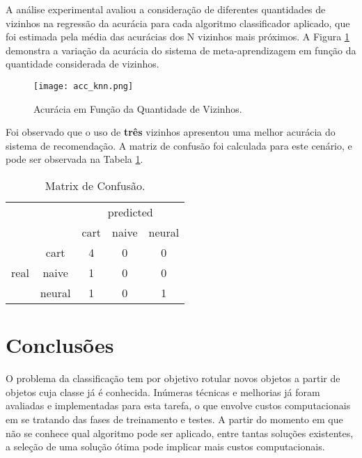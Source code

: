 \documentclass[runningheads]{llncs}
\begin{document}
A análise experimental avaliou a consideração de diferentes quantidades de vizinhos na regressão da acurácia para cada algoritmo classificador aplicado, que foi estimada pela média das acurácias dos N vizinhos mais próximos. A Figura \ref{acc} demonstra a variação da acurácia do sistema de meta-aprendizagem em função da quantidade considerada de vizinhos. 

\begin{figure}[ht]
\texttt{[image: acc\_knn.png]}
\caption{Acurácia em Função da Quantidade de Vizinhos.} \label{acc}
\end{figure}

Foi observado que o uso de \textbf{três} vizinhos apresentou uma melhor acurácia do sistema de recomendação. A matriz de confusão foi calculada para este cenário, e pode ser observada na Tabela \ref{confusion_matrix}.

\begin{table}[ht]
\centering
\caption{Matrix de Confusão.}\label{confusion_matrix}
\begin{tabular}{cc|c|c|c|}
\cline{3-5}
                                            &        & \multicolumn{3}{c|}{predicted} \\ \cline{3-5} 
                                            &        & cart    & naive    & neural    \\ \hline
\multicolumn{1}{|c|}{\multirow{3}{*}{real}} & cart   & 4       & 0        & 0         \\ \cline{2-5} 
\multicolumn{1}{|c|}{}                      & naive  & 1       & 0        & 0         \\ \cline{2-5} 
\multicolumn{1}{|c|}{}                      & neural & 1       & 0        & 1         \\ \hline
\end{tabular}
\end{table}

\section{Conclusões}

O problema da classificação tem por objetivo rotular novos objetos a partir de objetos cuja classe já é conhecida. Inúmeras técnicas e melhorias já foram avaliadas e implementadas para esta tarefa, o que envolve custos computacionais em se tratando das fases de treinamento e testes. A partir do momento em que não se conhece qual algoritmo pode ser aplicado, entre tantas soluções existentes, a seleção de uma solução ótima pode implicar mais custos computacionais.
\end{document}
